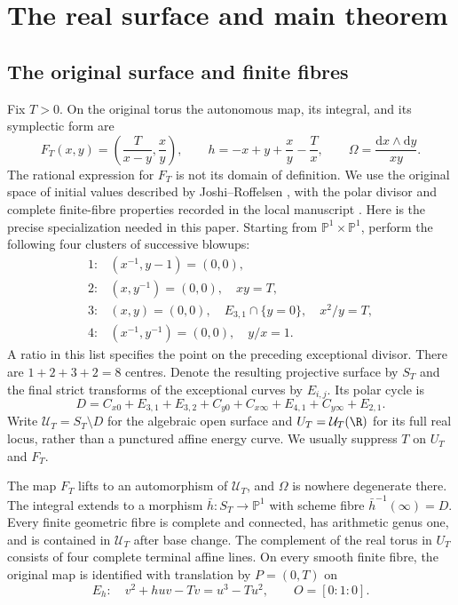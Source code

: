 \section{The real surface and main theorem}
\label{sec:surface}

\subsection{The original surface and finite fibres}

Fix $T>0$. On the original torus the autonomous map, its integral,
and its symplectic form are
\begin{equation}
 F_T(x,y)=\left(\frac{T}{x-y},\frac{x}{y}\right),\qquad
 h=-x+y+\frac{x}{y}-\frac{T}{x},\qquad
 \Omega=\frac{\mathrm dx\wedge\mathrm dy}{xy}.
 \label{eq:map}
\end{equation}
The rational expression for $F_T$ is not its domain of definition.
We use the original space of initial values described by
Joshi--Roffelsen \cite[Section 2.1]{JoshiRoffelsen2026}, with the polar
divisor and complete finite-fibre properties recorded in the local
manuscript \cite[Section 2]{QPI30Local2026}. Here is the precise specialization
needed in this paper. Starting from $\mathbb P^1\times\mathbb P^1$,
perform the following four clusters of successive blowups:
\[
\begin{array}{cl}
1:&(x^{-1},y-1)=(0,0),\\
2:&(x,y^{-1})=(0,0),\quad xy=T,\\
3:&(x,y)=(0,0),\quad E_{3,1}\cap\{y=0\},\quad x^2/y=T,\\
4:&(x^{-1},y^{-1})=(0,0),\quad y/x=1.
\end{array}
\]
A ratio in this list specifies the point on the preceding exceptional
divisor. There are $1+2+3+2=8$ centres. Denote the resulting projective
surface by $S_T$ and the final strict transforms of the exceptional
curves by $E_{i,j}$. Its polar cycle is
\[
D=C_{x0}+E_{3,1}+E_{3,2}+C_{y0}+C_{x\infty}
  +E_{4,1}+C_{y\infty}+E_{2,1}.
\]
Write $\mathcal U_T=S_T\setminus D$ for the algebraic open surface
and $U_T=\mathcal U_T(\R)$ for its full real locus, rather than a
punctured affine energy curve. We usually suppress $T$ on $U_T$ and $F_T$.

\begin{proposition}\label{prop:surface}
The map $F_T$ lifts to an automorphism of $\mathcal U_T$, and $\Omega$
is nowhere degenerate there. The integral extends to a morphism
$\bar h:S_T\to\mathbb P^1$ with scheme fibre $\bar h^{-1}(\infty)=D$.
Every finite geometric fibre is complete and connected, has arithmetic
genus one, and is contained in $\mathcal U_T$ after base change.
The complement of the real torus in $U_T$
consists of four complete terminal affine lines. On every smooth
finite fibre, the original map is identified with translation by
$P=(0,T)$ on
\begin{equation}
 E_h:\quad v^2+huv-Tv=u^3-Tu^2,\qquad O=[0:1:0].
 \label{eq:weierstrass}
\end{equation}
\end{proposition}

